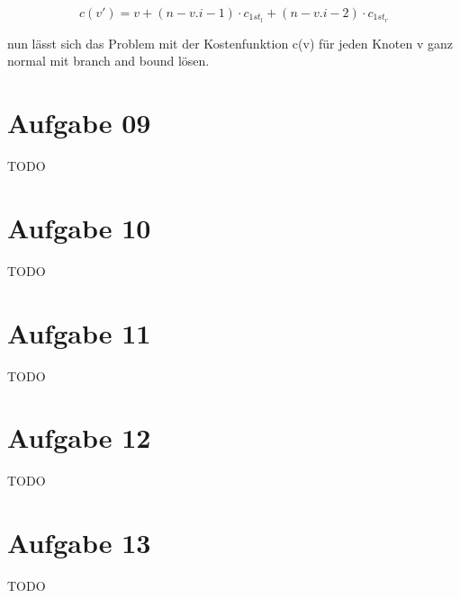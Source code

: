 \documentclass[10pt,a4paper]{article}
\begin{document}
    $$
        c(v') = v + (n-v.i-1) \cdot c_{1st_l} + (n-v.i-2) \cdot c_{1st_r}
    $$
    
    nun l\"asst sich das Problem mit der Kostenfunktion c(v) f\"ur jeden
    Knoten v ganz normal mit branch and bound l\"osen.


    
    
\section*{Aufgabe 09}
    TODO
    
\section*{Aufgabe 10}
    TODO
    
\section*{Aufgabe 11}
    TODO
    
\section*{Aufgabe 12}
    TODO
    
\section*{Aufgabe 13}
    TODO
    
    
    
\end{document}
